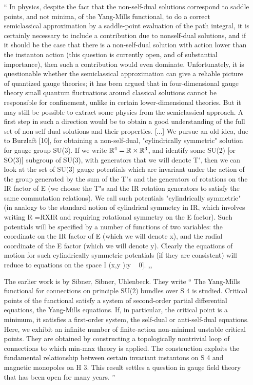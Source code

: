 \begin{description}
``
In physics, despite the fact that the non-self-dual solutions correspond
to saddle points, and not minima, of the Yang-Mills functional, to do a
correct semiclassical approximation by a saddle-point evaluation of the
path integral, it is certainly necessary to include a contribution due to
nonself-dual solutions, and if it should be the case that there is a
non-self-dual solution with action lower than the instanton action (this
question is currently open, and of substantial importance), then such a
contribution would even dominate. Unfortunately, it is questionable
whether the semiclassical approximation can give a reliable picture of
quantized gauge theories; it has been argued that in four-dimensional
gauge theory small quantum fluctuations
around classical solutions cannot be responsible for
confinement, unlike in certain lower-dimensional
theories. But it may still be possible to extract some
physics from the semiclassical approach. A first step in
such a direction would be to obtain a good understanding
of the full set of non-self-dual solutions and their properties.
[...] We pursue an old idea, due to Burzlaft
[10], for obtaining a non-self-dual, "cylindrically symmetric"
solution for gauge group SU(3). If we write
$\mathbb{R}^4 = \mathbb{R} \times \mathbb{R}^3$, and identify some SU(2) [or SO(3)] subgroup
of SU(3), with generators that we will denote T', then we
can look at the set of SU(3) gauge potentials which are invariant
under the action of the group generated by the
sum of the T"s and the generators of rotations on the IR
factor of E (we choose the T"s and the IR rotation generators
to satisfy the same commutation relations). We
call such potentials "cylindrically symmetric" (in analogy
to the standard notion of cylindrical symmetry in IR,
which involves writing R =RXIR and requiring rotational
symmetry on the E factor). Such potentials will
be specified by a number of functions of two variables:
the coordinate on the IR factor of E (which we will
denote x), and the radial coordinate of the E factor
(which we will denote y). Clearly the equations of motion
for such cylindrically symmetric potentials (if they are
consistent) will reduce to equations on the space
I (x,y ):y ~ 0].
,,

The earlier work is by Sibner, Sibner, Uhlenbeck. They
write ``
The Yang-Mills functional for connections on principle SU(2) bundles over
S 4 is studied. Critical points of the functional satisfy a system of
second-order partial differential equations, the Yang-Mills equations. If,
in particular, the critical point is a minimum, it satisfies a
first-order system, the self-dual or anti-self-dual equations. Here, we
exhibit an infinite number of finite-action non-minimal unstable critical
points. They are obtained by constructing a topologically nontrivial loop
of connections to which min-max theory is applied. The construction
exploits the fundamental relationship between certain invariant
instantons on S 4 and magnetic monopoles on H 3. This result settles a
question in gauge field theory that has been open for many years.
''


\end{description}
